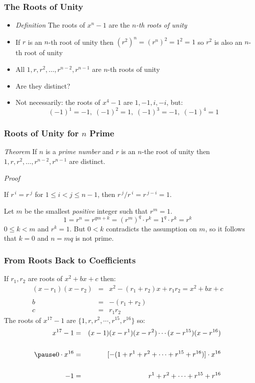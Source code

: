 \documentclass{beamer}
\begin{document}

\begin{frame}
\frametitle{The Roots of Unity}

\begin{itemize}
\item \textit{Definition} The roots of $x^{n}-1$ are the \emph{$n$-th roots of unity}
\medskip
\item  If $r$ is an $n$-th root of unity then $(r^{2})^n=(r^{n})^2=1^2=1$ so $r^2$ is also an $n$-th root of unity
\medskip
\item All $1, r, r^2, \ldots, r^{n-2}, r^{n-1}$ are $n$-th roots of unity
\medskip
\item Are they distinct?
\pause
\medskip
\item Not necessarily: the roots of $x^4-1$ are $1,-1,i,-i$, but:
\[
(-1)^1=-1,\;(-1)^2=1,\; (-1)^3=-1,\; (-1)^4=1
\]
\end{itemize}
\end{frame}


\begin{frame}
\frametitle{Roots of Unity for $n$ Prime}

\textit{Theorem} If $n$ is a \textit{prime number} and $r$ is an $n$-the root of unity then $1,r,r^2,\ldots,r^{n-2},r^{n-1}$ are distinct.

\medskip

\textit{Proof}

If $r^{\,i}=r{\,^j}$ for $1\leq i < j \leq n-1$, then $r{\,^j}/r{\,^i}=r{\,^{j-i}}=1$.

Let $m$ be the smallest \textit{positive} integer such that $r^{m}=1$.
\[
1=r^n=r^{qm+k}=(r^m)^q\cdot r^k=1^q\cdot r^k=r^k
\]
$0\leq k<m$ and $r^k=1$. But $0<k$ contradicts the assumption on $m$, so it follows that $k=0$ and $n=mq$ is not prime.

\end{frame}


\begin{frame}
\frametitle{From Roots Back to Coefficients}

If $r_1,r_2$ are roots of $x^2+bx+c$ then:
\begin{eqnarray*}
(x-r_1)(x-r_2)&=&x^2 - (r_1+r_2)x + r_1r_2=x^2+bx+c\\\\
b&=&-(r_1+r_2)\\
c&=&r_1r_2
\end{eqnarray*}
\pause
The roots of $x^{17}-1$ are $\{1,r,r^2,\cdots, r^{15}, r^{16}\}$  so:
\begin{eqnarray*}
x^{17}-1&=&(x-1)(x-r^1)(x-r^2)\cdots (x-r^{15})(x-r^{16})\\\\
\pause
0\cdot x^{16} &=& [-(1+r^1+r^2+\cdots+r^{15}+r^{16})]\cdot x^{16}\\\\
-1&=&r^1+r^2+\cdots+r^{15}+r^{16}
\end{eqnarray*}

\end{frame}
\end{document}
